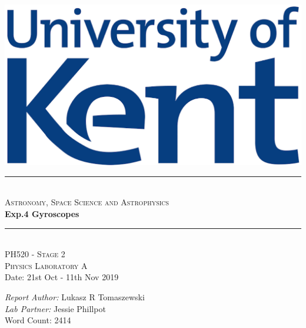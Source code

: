 \documentclass[12pt]{article}
\title{}
\begin{document}
\begin{titlepage}
\newcommand{\HRule}{\rule{\linewidth}{0.5mm}}
\begin{centering} 
\includegraphics[scale=0.6]{Images/Uni_of_Kent.png}\\[1cm]
\HRule \\[0.4cm]
\textsc{\large Astronomy, Space Science and Astrophysics}\\[0.5cm]
{ \Huge \bfseries Exp.4 Gyroscopes}\\[0.4cm]
\HRule \\[1.0cm]
\textsc{\Large PH520 - Stage 2}\\[0.5cm] 
\textsc{\Large Physics Laboratory A}\\[0.5cm] 
{\large Date: 21st Oct - 11th Nov 2019}\\[0.5cm]
\begin{minipage}{0.625\textwidth}
\begin{center} \large
\emph{Report Author:} Lukasz R Tomaszewski \\[0.2cm]
\emph{Lab Partner:} Jessie Phillpot \\ [0.5cm]
{\large Word Count: 2414}\\
\end{center}
\end{minipage}\\[2cm]
\vfill
\end{centering} 
\end{titlepage}
\end{document}
